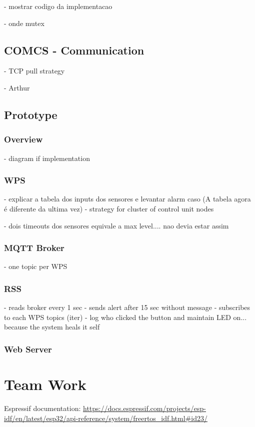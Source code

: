 \documentclass[11pt]{article}
\begin{document}
- mostrar codigo da implementacao

- onde mutex

\subsection{COMCS - Communication}

- TCP pull strategy

- Arthur

\subsection{Prototype}

\subsubsection{Overview}

- diagram if implementation

\subsubsection{WPS}

- explicar a tabela dos inputs dos sensores e levantar alarm caso (A tabela agora é diferente da ultima vez)
- strategy for cluster of control unit nodes

- dois timeouts dos sensores equivale a max level.... nao devia estar assim

\subsubsection{MQTT Broker}

- one topic per WPS

\subsubsection{RSS}

- reads broker every 1 sec
- sends alert after 15 sec without message
- subscribes to each WPS topics (iter)
- log who clicked the button and maintain LED on... because the system heals it self 

\subsubsection{Web Server}

\section{Team Work}


\newpage
\begin{thebibliography}{8}

 Espressif documentation: {\url{https://docs.espressif.com/projects/esp-idf/en/latest/esp32/api-reference/system/freertos_idf.html#id23/}}

\end{thebibliography}
\end{document}
